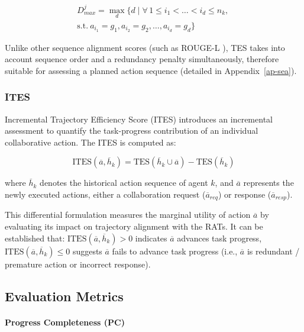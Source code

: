 \documentclass[11pt]{article}
\begin{document}
\begin{multline}
  \label{eq:dmax}
     D_{max}^j = \max_d \{ d \mid \forall \, 1 \leq i_1 < \dots < i_d \leq n_k, \, \\
     \text{s.t.} \ a_{i_1} = g_1, a_{i_2} = g_2, \dots, a_{i_d} = g_d \}
\end{multline}

Unlike other sequence alignment scores (such as ROUGE-L \cite{lin2004rouge}), TES takes into account sequence order and a redundancy penalty simultaneously, therefore suitable for assessing a planned action sequence (detailed in Appendix~\ref{ap-sea}). 




\subsubsection{ITES}

Incremental Trajectory Efficiency Score (ITES) introduces an incremental assessment to quantify the task-progress contribution of an individual collaborative action. The ITES is computed as:

\begin{equation}
  \label{eq:isea1}
\text{ITES}(\overline{a}, \overline{h}_k) = \text{TES}(\overline{h}_k \cup \overline{a}) - \text{TES}(\overline{h}_k)
\end{equation}

\noindent where $\overline{h}_k$ denotes the historical action sequence of agent $k$, and $\overline{a}$ represents the newly executed actions, either a collaboration request ($\overline{a}_{req}$) or response ($\overline{a}_{resp}$).

This differential formulation measures the marginal utility of action $\overline{a}$ by evaluating its impact on trajectory alignment with the RATs. It can be established that: $\text{ITES}(\overline{a}, \overline{h}_k) > 0$ indicates $\overline{a}$ advances task progress, $\text{ITES}(\overline{a}, \overline{h}_k) \leq 0$ suggests $\overline{a}$ fails to advance task progress (i.e., $\overline{a}$ is redundant / premature action or incorrect response).


\subsection{Evaluation Metrics}

\paragraph{Progress Completeness (PC)} 
\end{document}
